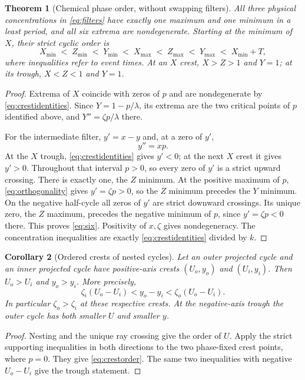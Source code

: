 \documentclass[11pt,a4paper]{article}
\numberwithin{equation}{section}
\newtheorem{theorem}{Theorem}[section]
\newtheorem{corollary}[theorem]{Corollary}
\theoremstyle{remark}\newtheorem{remark}[theorem]{Remark}
\begin{document}
\begin{theorem}[Chemical phase order, without swapping filters]\label{thm:six}
All three physical concentrations in \eqref{eq:filters} have exactly one maximum and one minimum in a least period, and all six extrema are nondegenerate. Starting at the minimum of $X$, their strict cyclic order is
\begin{equation}\label{eq:six}
X_{\min}\;<\;Z_{\min}\;<\;Y_{\min}\;<\;
X_{\max}\;<\;Z_{\max}\;<\;Y_{\max}\;<\;X_{\min}+T,
\end{equation}
where inequalities refer to event times. At an $X$ crest, $X>Z>1$ and $Y=1$; at its trough, $X<Z<1$ and $Y=1$.
\end{theorem}
\begin{proof}
Extrema of $X$ coincide with zeros of $p$ and are nondegenerate by \eqref{eq:crestidentities}. Since $Y=1-p/\lambda$, its extrema are the two critical points of $p$ identified above, and $Y''=\zeta p/\lambda$ there.

For the intermediate filter, $y'=x-y$ and, at a zero of $y'$,
\[
y''=xp.
\]
At the $X$ trough, \eqref{eq:crestidentities} gives $y'<0$; at the next $X$ crest it gives $y'>0$. Throughout that interval $p>0$, so every zero of $y'$ is a strict upward crossing. There is exactly one, the $Z$ minimum. At the positive maximum of $p$, \eqref{eq:orthogonality} gives $y'=\zeta p>0$, so the $Z$ minimum precedes the $Y$ minimum. On the negative half-cycle all zeros of $y'$ are strict downward crossings. Its unique zero, the $Z$ maximum, precedes the negative minimum of $p$, since $y'=\zeta p<0$ there. This proves \eqref{eq:six}. Positivity of $x,\zeta$ gives nondegeneracy. The concentration inequalities are exactly \eqref{eq:crestidentities} divided by $k$.
\end{proof}

\begin{corollary}[Ordered crests of nested cycles]\label{cor:orderedcrests}
Let an outer projected cycle and an inner projected cycle have positive-axis crests $(U_o,y_o)$ and $(U_i,y_i)$. Then $U_o>U_i$ and $y_o>y_i$. More precisely,
\begin{equation}\label{eq:crestorder}
\zeta_i(U_o-U_i)<y_o-y_i<\zeta_o(U_o-U_i).
\end{equation}
In particular $\zeta_o>\zeta_i$ at these respective crests. At the negative-axis trough the outer cycle has both smaller $U$ and smaller $y$.
\end{corollary}
\begin{proof}
Nesting and the unique ray crossing give the order of $U$. Apply the strict supporting inequalities in both directions to the two phase-fixed crest points, where $p=0$. They give \eqref{eq:crestorder}. The same two inequalities with negative $U_o-U_i$ give the trough statement.
\end{proof}
\end{document}
